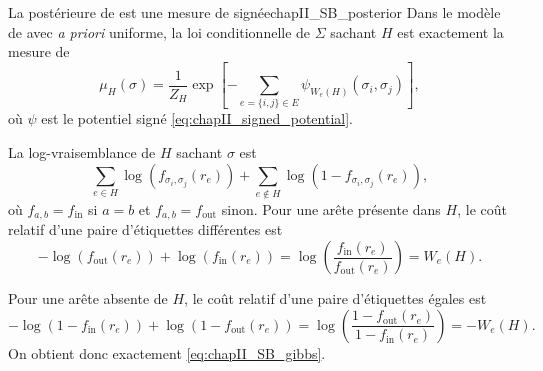 \begin{Fait}{La postérieure de  est une mesure de  signée}{chapII_SB_posterior}
Dans le modèle de \SB{} avec \emph{a priori} uniforme, la loi conditionnelle de $\Sigma$ sachant $H$ est exactement la mesure de 
\begin{equation}
    \mu_H(\sigma)
    =
    \frac1{Z_H}
    \exp\left[-\sum_{e=\{i,j\}\in E}\psi_{W_e(H)}(\sigma_i,\sigma_j)\right],
    \label{eq:chapII_SB_gibbs}
\end{equation}
où $\psi$ est le potentiel signé \eqref{eq:chapII_signed_potential}.
\end{Fait}

\begin{Preuve}
La log-vraisemblance de $H$ sachant $\sigma$ est
\[
    \sum_{e\in H} \log\left(f_{\sigma_i,\sigma_j}(r_e)\right)
    +\sum_{e\notin H}\log \left(1-f_{\sigma_i,\sigma_j}(r_e)\right),
\]
où $f_{a,b}=f_{\mathrm{in}}$ si $a=b$ et $f_{a,b}=f_{\mathrm{out}}$ sinon. 
Pour une arête présente dans $H$, le coût relatif d'une paire d'étiquettes différentes est
\[
    -\log \left(f_{\mathrm{out}} (r_e)\right)
    + \log \left(f_{\mathrm{in}} (r_e)\right)
    =
    \log\left(\frac{f_{\mathrm{in}}(r_e)}{f_{\mathrm{out}}(r_e)}\right)
    =
    W_e(H).
\]

Pour une arête absente de $H$, le coût relatif d'une paire d'étiquettes égales est
\[
    -\log \left(1-f_{\mathrm{in}} (r_e)\right)
    + \log \left(1-f_{\mathrm{out}} (r_e)\right)
    =
    \log\left(\frac{1-f_{\mathrm{out}}(r_e)}{1-f_{\mathrm{in}}(r_e)}\right)
    =
    -W_e(H).
\]
On obtient donc exactement \eqref{eq:chapII_SB_gibbs}.
\end{Preuve}


